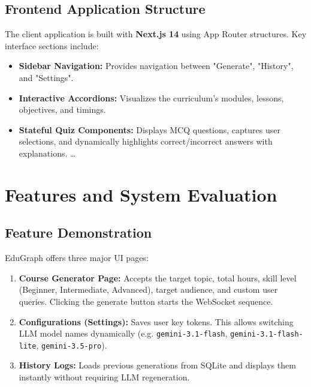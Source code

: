 \documentclass[12pt,a4paper]{report}
\begin{document}
\section{Frontend Application Structure}
The client application is built with \textbf{Next.js 14} using App Router structures. Key interface sections include:
\begin{itemize}
    \item \textbf{Sidebar Navigation:} Provides navigation between "Generate", "History", and "Settings".
    \item \textbf{Interactive Accordions:} Visualizes the curriculum's modules, lessons, objectives, and timings.
    \item \textbf{Stateful Quiz Components:} Displays MCQ questions, captures user selections, and dynamically highlights correct/incorrect answers with explanations.
    \dots
\end{itemize}

\chapter{Features and System Evaluation}
\label{ch:evaluation}

\section{Feature Demonstration}
EduGraph offers three major UI pages:
\begin{enumerate}
    \item \textbf{Course Generator Page:} Accepts the target topic, total hours, skill level (Beginner, Intermediate, Advanced), target audience, and custom user queries. Clicking the generate button starts the WebSocket sequence.
    \item \textbf{Configurations (Settings):} Saves user key tokens. This allows switching LLM model names dynamically (e.g. \texttt{gemini-3.1-flash}, \texttt{gemini-3.1-flash-lite}, \texttt{gemini-3.5-pro}).
    \item \textbf{History Logs:} Loads previous generations from SQLite and displays them instantly without requiring LLM regeneration.
\end{enumerate}
\end{document}
